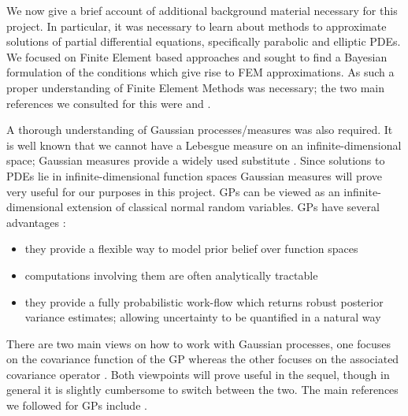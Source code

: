 We now give a brief account of additional background material necessary for this project. In particular, it was necessary to learn about methods to approximate solutions of partial differential equations, specifically parabolic and elliptic PDEs. We focused on Finite Element based approaches and sought to find a Bayesian formulation of the conditions which give rise to FEM approximations. As such a proper understanding of Finite Element Methods was necessary; the two main references we consulted for this were \textcolor{blue}{\citep{lord2014introduction}} and \textcolor{blue}{\citep{larsson2008partial}}.

A thorough understanding of Gaussian processes/measures was also required. It is well known that we cannot have a Lebesgue measure on an infinite-dimensional space; Gaussian measures provide a widely used substitute \textcolor{blue}{\citep{da2006introduction}}. Since solutions to PDEs lie in infinite-dimensional function spaces Gaussian measures will prove very useful for our purposes in this project. GPs can be viewed as an infinite-dimensional extension of classical normal random variables. GPs have several advantages \textcolor{blue}{\citep{raissi2017machine}}:
\begin{itemize}
    \item they provide a flexible way to model prior belief over function spaces
    \item computations involving them are often analytically tractable
    \item they provide a fully probabilistic work-flow which returns robust posterior variance estimates; allowing uncertainty to be quantified in a natural way
\end{itemize}
There are two main views on how to work with Gaussian processes, one focuses on the covariance function of the GP \textcolor{blue}{\citep{Rasmussen06gaussianprocesses}} whereas the other focuses on the associated covariance operator \textcolor{blue}{\citep{da2006introduction,lifshits2012lectures,lunardi2015infinite}}. Both viewpoints will prove useful in the sequel, though in general it is slightly cumbersome to switch between the two. The main references we followed for GPs include \textcolor{blue}{\citep{da2006introduction,Rasmussen06gaussianprocesses,lifshits2012lectures,lunardi2015infinite}}.

